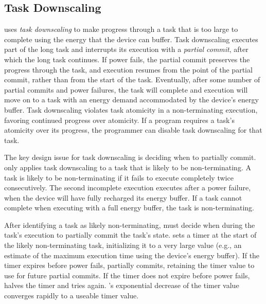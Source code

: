\subsection{Task Downscaling}
\label{sec:task_downsizing}

\sys uses {\em task downscaling} to make progress through a task that is too
large to complete using the energy that the device can buffer.  Task
downscaling executes part of the long task and interrupts its execution with a
{\em partial commit}, after which the long task continues.  If power fails, the
partial commit preserves the progress through the task, and execution resumes
from the point of the partial commit, rather than from the start of the task.
Eventually, after some number of partial commits and power failures, the task
will complete and execution will move on to a task with an energy demand
accommodated by the device's energy buffer. Task downscaling violates task
atomicity in a non-terminating execution, favoring continued progress over
atomicity.  If a program requires a task's atomicity over its progress, 
the programmer can disable task downscaling for that task.

The key design issue for task downscaling is deciding when to partially commit.
\sys only applies task downscaling to a task that is likely to be
non-terminating.  A task is likely to be non-terminating if it fails to execute
completely twice consecutively. The second incomplete execution executes after
a power failure, when the device will have fully recharged its energy buffer.
If a task cannot complete when executing with a full energy buffer, the task is
non-terminating.

After identifying a task as likely non-terminating, \sys must decide when
during the task's execution to partially commit the task's state.
%
\sys sets a timer at the start of the likely non-terminating task, initializing
it to a very large value (e.g., an estimate of the maximum execution time using
the device's energy buffer).
%
If the timer expires before power fails, \sys partially commits, retaining 
the timer value to use for future partial commits. 
%
If the timer does not expire before power fails, \sys halves the timer and
tries again.
%
\sys's exponential decrease of the timer value converges rapidly to a useable
timer value.


